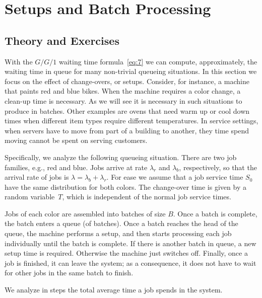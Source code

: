 \section{Setups and Batch Processing}
\label{sec:setups-batch-proc}

\subsection*{Theory and Exercises}


With the $G/G/1$ waiting time formula~\eqref{eq:7} we can compute, approximately,  the waiting time in queue for many non-trivial queueing situations. In this section we focus on the effect of change-overs, or setups. Consider, for instance, a  machine that paints red and blue bikes. When the machine requires a color change, a clean-up time is necessary. As we will see it is necessary in such situations to produce in batches.  Other examples are ovens that need  warm up or cool down times when different item types require different temperatures. In service settings, when servers have to move from part of a building to another,  they time spend moving cannot be spent on serving customers.  

Specifically, we analyze the following queueing situation. There are two job families, e.g., red and blue. Jobs arrive at rate $\lambda_r$ and $\lambda_b$, respectively, so that the arrival rate of jobs is $\lambda= \lambda_b+\lambda_r$. For ease we assume that a job service time $S_0$ have the same distribution for both colors. The change-over time is given by a random variable~$T$, which is independent of the normal job service times. 

Jobs of each color are assembled into batches of size $B$. Once a batch is complete, the batch enters a queue (of batches). Once a batch reaches the head of the queue, the machine performs a setup, and then starts processing each job individually until the batch is complete. If there is another batch in queue, a new setup time is required. Otherwise the machine just switches off. Finally, once a job is finished, it can leave the system; as a consequence, it does not have to wait for other jobs in the same batch to finish.  

We analyze in steps the total average time a job spends in the system. 

